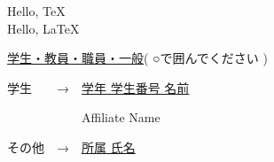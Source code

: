 \documentclass{article}
\begin{document}
Hello, \TeX \\

Hello, \LaTeX \\

\begin{description}
\item{} \underline{学生・教員・職員・一般}{\footnotesize ( ○で囲んでください ) }
\item{} 学生　　→　\underline{学年\hspace{2cm} 学生番号\hspace{3cm} 名前\hspace{5cm}}
\item{} 　　　　　　Affiliate\hspace{62mm} Name\hspace{5cm} \vspace*{-3mm}
\item{} その他　→　\underline{所属\hspace{67.5mm} 氏名\hspace{5cm}}
\end{description}
\end{document}
